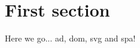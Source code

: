 \documentclass[11pt,a4paper,openany,oneside]{book}
\begin{document}
	
	\tableofcontents
	\printglossary[style=modsuper, type=\acronymtype]
	
	\section{First section}
	
	Here we go... \gls{ad}, \gls{dom}, \gls{svg} and \gls{spa}!
\end{document}
